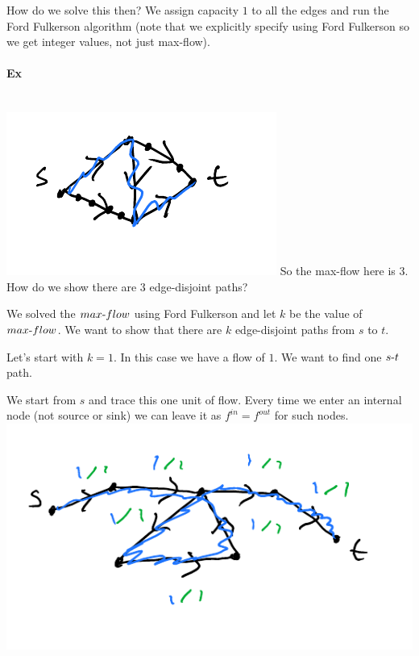 \documentclass[12 pt]{article}
\begin{document}
        How do we solve this then? We assign capacity $1$ to all the
        edges and run the Ford Fulkerson algorithm (note that we
        explicitly specify using Ford Fulkerson so we get integer
        values, not just max-flow).
        \paragraph{Ex} ~
        \\ \includegraphics[width=.9\textwidth]{i69.pdf}
        So the max-flow here is $3$. How do we show there are $3$ edge-disjoint paths?

        We solved the $max\hbox{-}flow$ using Ford Fulkerson and let
        $k$ be the value of $max\hbox{-}flow$. We want to show that
        there are $k$ edge-disjoint paths from $s$ to $t$.

        Let's start with $k=1$. In this case we have a flow of
        $1$. We want to find one $s\hbox{-}t$ path.

        We start from $s$ and trace this one unit of flow. Every time
        we enter an internal node (not source or sink) we can leave it
        as $f^{in}=f^{out}$ for such nodes.
        \\ \includegraphics[width=.9\textwidth]{i71.pdf}
\end{document}
